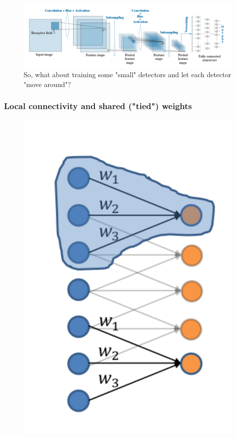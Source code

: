 \documentclass[12pt]{report}
\theoremstyle{plain}
\begin{document}
\begin{flushleft}
\begin{figure}[!h]
	\centering
	\includegraphics[scale=0.7]{images/convNN_scheme.pdf}
	\caption{So, what about training some "small" detectors and let each detector "move around"?}
	\label{fig:convNN_scheme}
\end{figure}

\subsubsection{Local connectivity and shared ("tied") weights}
\begin{figure}[!h]
	\begin{minipage}{0.5\textwidth}
		\includegraphics[scale=0.5]{images/conv_NN_localconn_sharedw.pdf}

\end{minipage}
\end{figure}
\end{flushleft}
\end{document}
